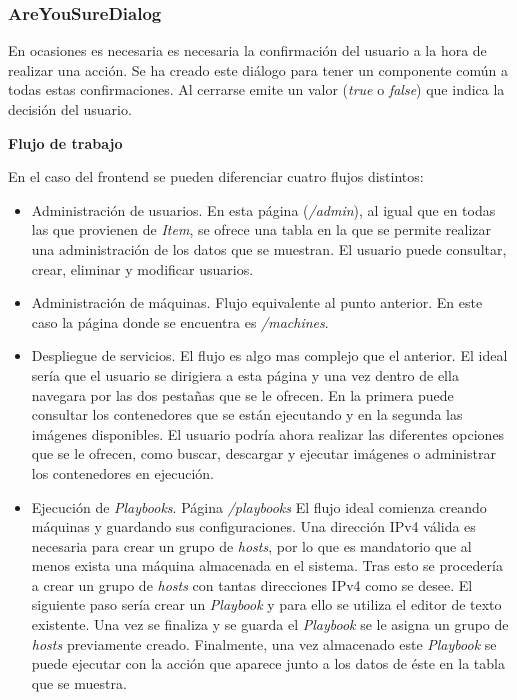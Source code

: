 \subsubsection{AreYouSureDialog}


En ocasiones es necesaria es necesaria la confirmación del usuario a la hora de realizar una acción. Se ha creado este  diálogo para tener un componente común a todas estas confirmaciones. Al cerrarse emite un valor (\textit{true} o \textit{false}) que indica la decisión del usuario.


\bigskip
\textbf{Flujo de trabajo}

En el caso del frontend se pueden diferenciar cuatro flujos distintos:

\begin{itemize}
	\item Administración de usuarios. En esta página (\textit{/admin}), al igual que en todas las que provienen de \textit{Item}, se ofrece una tabla en la que se permite realizar una administración de los datos que se muestran. El usuario puede consultar, crear, eliminar y modificar usuarios.
	\item Administración de máquinas. Flujo equivalente al punto anterior. En este caso la página donde se encuentra es \textit{/machines}.
	\item Despliegue de servicios. El flujo es algo mas complejo que el anterior. El ideal sería que el usuario se dirigiera a esta página y una vez dentro de ella navegara por las dos pestañas que se le ofrecen. En la primera puede consultar los contenedores que se están ejecutando y en la segunda las imágenes disponibles. El usuario podría ahora realizar las diferentes opciones que se le ofrecen, como buscar, descargar y ejecutar imágenes o administrar los contenedores en ejecución.
	\item Ejecución de \textit{Playbooks}. Página \textit{/playbooks} El flujo ideal comienza creando máquinas y guardando sus configuraciones. Una dirección IPv4 válida es necesaria para crear un grupo de \textit{hosts}, por lo que es mandatorio que al menos exista una máquina almacenada en el sistema. Tras esto se procedería a crear un grupo de \textit{hosts} con tantas direcciones IPv4 como se desee. El siguiente paso sería crear un \textit{Playbook} y para ello se utiliza el editor de texto existente. Una vez se finaliza y se guarda el \textit{Playbook} se le asigna un grupo de \textit{hosts} previamente creado. Finalmente, una vez almacenado este \textit{Playbook} se puede ejecutar con la acción que aparece junto a los datos de éste en la tabla que se muestra.
\end{itemize}


